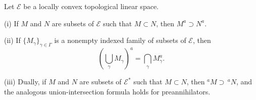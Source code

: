 Let $\mathcal{E}$ be a locally convex topological linear space.

(i) If $M$ and $N$ are subsets of $\mathcal{E}$ such that $M \subset N$, then $M^a \supset N^a$.

(ii) If $\{ M_\gamma \}_{\gamma \in \Gamma}$ is a nonempty indexed family of subsets of $\mathcal{E}$, then
$$\left( \bigcup_\gamma M_\gamma \right)^a = \bigcap_\gamma M_\gamma^a.$$

(iii) Dually, if $M$ and $N$ are subsets of $\mathcal{E}^*$ such that $M \subset N$, then $^a M \supset \,^a N$, and the analogous union-intersection formula holds for preannihilators.
